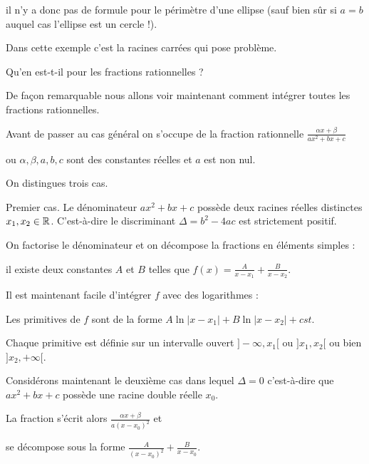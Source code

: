 il n'y a donc pas de formule 
pour le périmètre d'une ellipse 
(sauf bien sûr si $a=b$ auquel cas l'ellipse est un cercle !).

\change

Dans cette exemple c'est la racines carrées qui pose problème.


Qu'en est-t-il pour les fractions rationnelles ?

De façon remarquable nous allons voir maintenant comment intégrer toutes les fractions rationnelles.


\diapo

Avant de passer au cas général on s'occupe de la fraction rationnelle 
 $\frac{\alpha x + \beta}{a x^2+b x+c}$

ou $\alpha, \beta, a, b, c$ sont des constantes réelles et  $a$ est non nul.

On distingues trois cas.


\change

Premier cas. Le dénominateur $a x^2+b x+c$ possède deux racines réelles distinctes $x_1,x_ 2\in \mathbb{R}$.
C'est-à-dire le discriminant $\Delta=b^2-4ac$ est strictement positif.


\change

On factorise le dénominateur et on décompose la fractions en éléments simples :

\change

il existe deux constantes $A$ et $B$ telles que $f(x)=\frac{A}{x - x_1}+\frac{B}{x -x_2}$.

Il est maintenant facile d'intégrer $f$ avec des logarithmes :

\change

Les primitives de $f$ sont de la forme $A \ln|x - x_1|+B\ln|x -x_2|+cst$.

Chaque primitive est définie sur un intervalle ouvert $]-\infty,x_1[$ ou  $]x_1,x_2[$
ou bien $]x_2,+\infty[$.

\change

Considérons maintenant le deuxième cas dans lequel $\Delta=0$ c'est-à-dire que $a x^2+b x+c$ possède une racine 
double réelle $x_0$.

\change

La fraction s'écrit alors $\frac{\alpha x + \beta}{a(x -x_0)^2}$ et 

\change

se décompose sous la forme 
$\frac{A}{(x - x_0)^2}+\frac{B}{x - x_0}$. 

\change

